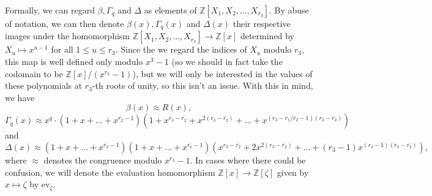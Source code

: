 \documentclass[12pt,a4paper]{article}
\theoremstyle{definition}
\newcommand{\Z}{\mathbb{Z}}
\newcommand{\z}{\zeta}
\newcommand{\ev}{\mathrm{ev}}
\newcommand{\uo}{\overline{r_2}}
\newcommand{\vo}{\overline{r_1}}
\begin{document}
Formally, we can regard $\beta,\Gamma_q$ and $\Delta$ as elements of $\Z[X_1,X_2,\dots,X_{r_3}]$. By abuse of notation, we can then denote $\beta(x),\Gamma_q(x)$ and $\Delta(x)$ their respective images under the homomorphism $\Z[X_1,X_2,\dots,X_{r_3}]\to \Z[x]$ determined by $X_u\mapsto x^{u-1}$ for all $1\leq u\leq r_3$. Since the we regard the indices of $X_u$ modulo $r_3$, this map is well defined only modulo $x^3-1$ (so we should in fact take the codomain to be $\Z[x]/(x^{r_3}-1)$), but we will only be interested in the values of these polynomials at $r_3$-th roots of unity, so this isn't an issue. With this in mind, we have
$$\beta(x)\approx R(x),$$
$$\Gamma_q(x)\approx x^q\cdot(1+x+\dots+x^{\uo-1})(1+x^{r_3-\uo}+x^{2(r_3-\uo)}+\dots+x^{(r_3-\vo/\uo-1)(r_3-\uo)})$$
and
$$\Delta(x)\approx(1+x+\dots+x^{\uo-1})(1+x+\dots+x^{\vo-1})(x^{r_3-\uo}+2x^{2(r_3-\uo)}+\dots+(r_3-1)x^{(r_3-1)(r_3-\uo)}),$$
where $\approx$ denotes the congruence modulo $x^{r_3}-1$.  In cases where there could be confusion, we will denote the evaluation homomorphism $\Z[x]\to \Z[\zeta]$ given by $x\mapsto\zeta$ by $\ev_{\z}$.
\end{document}
